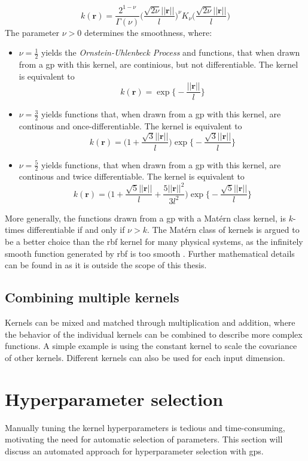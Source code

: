 \begin{equation}\label{eq:kernel_matern}
    k(\boldsymbol{r}) = \frac{2^{1-\nu}}{\Gamma(\nu)}\bigg(\frac{\sqrt{2 \nu} ||\boldsymbol{r}||}{l} \bigg)^\nu K_\nu \bigg(\frac{\sqrt{2\nu} || \boldsymbol{r}||}{l} \bigg)
\end{equation}
The parameter $\nu > 0$ determines the smoothness, where:
\begin{itemize}
    \item $\nu=\frac{1}{2}$ yields the \textit{Ornstein-Uhlenbeck Process} and functions, that when drawn from a \acrshort{gp} with this kernel, are continious, but not differentiable. The kernel is equivalent to $$k(\boldsymbol{r}) = \exp \big\{-\frac{||\boldsymbol{r}||}{l}\big\}$$
    \item $\nu=\frac{3}{2}$ yields functions that, when drawn from a \acrshort{gp} with this kernel, are continous and once-differentiable. The kernel is equivalent to $$k(\boldsymbol{r}) = \big(1 + \frac{\sqrt{3} ||\boldsymbol{r}||}{l}\big) \exp\big\{- \frac{\sqrt{3} ||\boldsymbol{r}||}{l}\big\}$$
    \item $\nu=\frac{5}{2}$ yields functions, that when drawn from a \acrshort{gp} with this kernel,  are continous and twice differentiable. The kernel is equivalent to $$k(\boldsymbol{r}) = \big(1 + \frac{\sqrt{5} ||\boldsymbol{r}||}{l} + \frac{5 ||\boldsymbol{r}||^2}{3 l^2}\big) \exp\big\{- \frac{\sqrt{5} ||\boldsymbol{r}||}{l}\big\}$$
\end{itemize}
More generally, the functions drawn from a \acrshort{gp} with a Matérn class kernel, is $k$-times differentiable if and only if $\nu > k$\cite{rasmussen}. The Matérn class of kernels is argued to be a better choice than the \acrshort{rbf} kernel for many physical systems, as the infinitely smooth function generated by \acrshort{rbf} is too smooth \cite{rasmussen}.
Further mathematical details can be found in \cite[sec.~4.2]{rasmussen} as it is outside the scope of this thesis.


\subsection{Combining multiple kernels}
Kernels can be mixed and matched through multiplication and addition, where the behavior of the individual kernels can be combined to describe more complex functions. A simple example is using the constant kernel to scale the covariance of other kernels. Different kernels can also be used for each input dimension.
\section{Hyperparameter selection}
Manually tuning the kernel hyperparameters is tedious and time-consuming, motivating the need for automatic selection of parameters. This section will discuss an automated approach for hyperparameter selection with \acrshort{gp}s.

